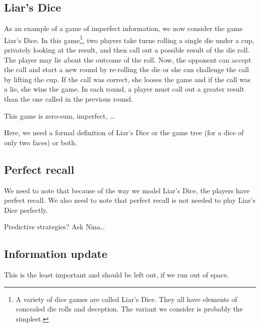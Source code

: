 \subsection{Liar's Dice}

As an example of a game of imperfect information, we now consider the game Liar's Dice. In this game\footnote{A variety of dice games are called Liar's Dice. They all have elements of concealed die rolls and deception. The variant we consider is probably the simplest.}, two players take turns rolling a single die under a cup, privately looking at the result, and then call out a possible result of the die roll. The player may lie about the outcome of the roll. Now, the opponent can accept the call and start a new round by re-rolling the die or she can challenge the call by lifting the cup. If the call was correct, she looses the game and if the call was a lie, she wins the game. In each round, a player must call out a greater result than the one called in the previous round.

This game is zero-sum, imperfect, \dots

{ \color{red} Here, we need a formal definition of Liar's Dice or the game tree (for a dice of only two faces) or both. }

\subsection{Perfect recall}

{ \color{red} We need to note that because of the way we model Liar's Dice, the players have perfect recall. We also need to note that perfect recall is not needed to play Liar's Dice perfectly. }

{ \color{red} Predictive strategies? Ask Nina\dots }

\subsection{Information update}

{ \color{red} This is the least important and should be left out, if we run out of space. }